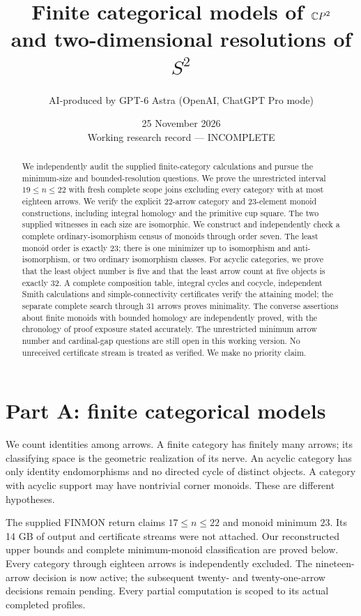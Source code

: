 \documentclass[11pt]{article}
\title{Finite categorical models of $\mathbb{C}P^2$\\and two-dimensional resolutions of $S^2$}
\author{AI-produced by GPT-6 Astra (OpenAI, ChatGPT Pro mode)}
\date{25 November 2026\\Working research record --- INCOMPLETE}
\begin{document}
\maketitle
\begin{abstract}
We independently audit the supplied finite-category calculations and pursue
the minimum-size and bounded-resolution questions. We prove the unrestricted interval $19\le n\le22$ with fresh complete scope joins excluding every category with at most eighteen arrows. We verify the explicit
22-arrow category and 23-element monoid constructions, including integral
homology and the primitive cup square. The two supplied witnesses in each
size are isomorphic. We construct and independently check a complete
ordinary-isomorphism census of monoids through order seven. The least
monoid order is exactly 23; there is one minimizer up to isomorphism and
anti-isomorphism, or two ordinary isomorphism classes. For acyclic
categories, we prove that the least object number is five and that the
least arrow count at five objects is exactly 32. A complete composition
table, integral cycles and cocycle, independent Smith calculations and
simple-connectivity certificates verify the attaining model; the separate
complete search through 31 arrows proves minimality. The converse
assertions about finite monoids with bounded homology are independently
proved, with the chronology of proof exposure stated accurately. The
unrestricted minimum arrow number and cardinal-gap questions are still open
in this working version. No unreceived certificate stream is treated as
verified. We make no priority claim.
\end{abstract}
\tableofcontents
\section{Part A: finite categorical models}
\label{CP2:partA}
We count identities among arrows. A finite category has finitely many
arrows; its classifying space is the geometric realization of its nerve.
An acyclic category has only identity endomorphisms and no directed cycle
of distinct objects. A category with acyclic support may have nontrivial
corner monoids. These are different hypotheses.

The supplied FINMON return claims $17\leq n\leq22$ and monoid minimum
$23$. Its 14 GB of output and certificate streams were not attached.
Our reconstructed upper bounds and complete minimum-monoid classification
are proved below. Every category through eighteen arrows is independently
excluded. The nineteen-arrow decision is now active; the subsequent
twenty- and twenty-one-arrow decisions remain pending. Every partial computation is scoped to
its actual completed profiles.
\end{document}
